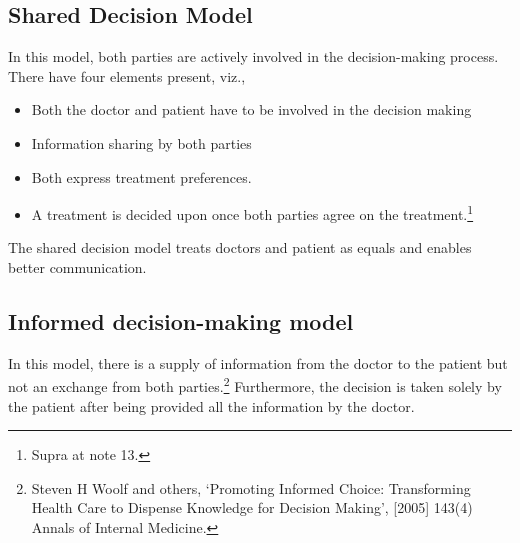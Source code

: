 \begin{multicols}{2}
\vspace{-.4cm}

\subsection*{Shared Decision Model}

\vspace{-.2cm}

\noi
In this model, both parties are actively involved in the decision-making process. There
have four elements present, viz.,

\vspace{-.5cm}

\begin{itemize}
\itemsep=0pt
\item Both the doctor and patient have to be involved in the decision making

\item Information sharing by both parties

\item Both express treatment preferences.

\item A treatment is decided upon once both parties agree on the treatment.\footnote{Supra at note 13.}

\vspace{-.5cm}
\end{itemize}



\noi
The shared decision model treats doctors and patient as equals and enables better
communication.


\vspace{-.3cm}

\subsection*{Informed decision-making model}

\vspace{-.2cm}

\noi
In this model, there is a supply of information from the doctor to the patient but not an
exchange from both parties.\footnote{Steven H Woolf and others, ‘Promoting Informed Choice: Transforming Health Care to Dispense Knowledge for Decision Making’, [2005] 143(4) Annals of Internal Medicine.} Furthermore, the decision is taken solely by the patient after being provided all the information by the doctor.

\vspace{-.3cm}


\end{multicols}
